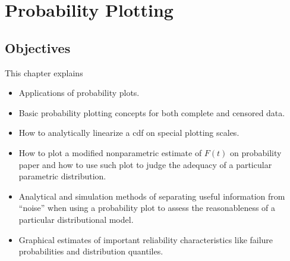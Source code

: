 \setcounter{chapter}{5}

\chapter{Probability Plotting}
\label{chapter:probability.plotting}



\section*{Objectives}
This chapter explains
\begin{itemize}
\item
Applications of probability plots.
\item
Basic  probability plotting concepts
for both complete and censored data. 
\item 
How to analytically linearize a cdf on special plotting scales.
\item 
How to plot a modified nonparametric estimate of $F(t)$
on probability paper and
how to use such plot to judge the adequacy of a particular
parametric distribution.
\item 
Analytical and simulation methods of separating useful
information from ``noise'' when using a probability plot to assess
the reasonableness of a particular distributional model.
\item 
Graphical
estimates of important reliability characteristics like failure
probabilities and distribution quantiles.

\end{itemize}


